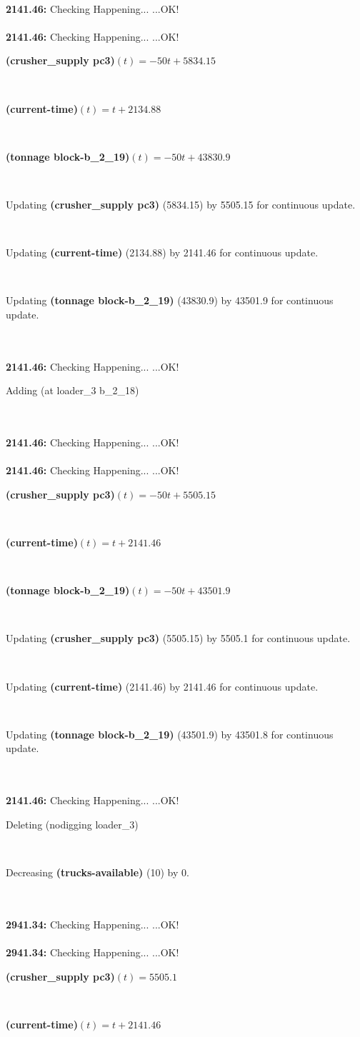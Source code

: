 \documentclass[a4paper,12pt]{article}
\newcommand{\atime}[1]{{\bf #1:}}
\newcommand{\exprn}[1]{{\sf #1}}
\newcommand{\fexprn}[1]{{\small {\bf #1}}}
\newcommand{\checkhappening}{Checking Happening... }
\newcommand{\listrow}[1]{\begin{minipage}[t]{11.5cm} #1 \end{minipage}}
\newcommand{\happeningOK}{...OK!}
\newcommand{\assignmentcts}[3]{\listrow{Updating \fexprn{#1} (#2) by #3 for continuous update.}}
\newcommand{\decrease}[3]{\listrow{Decreasing \fexprn{#1} (#2) by #3.}}
\newcommand{\function}[2]{\listrow{\fexprn{#1}$(t) = #2$}}
\newcommand{\adding}[1]{\listrow{Adding \exprn{#1} }}
\newcommand{\deleting}[1]{\listrow{Deleting \exprn{#1} }}
\begin{document}
\begin{tabbing}
\\
\atime{2141.46} \> \checkhappening\happeningOK\\
\\
\atime{2141.46} \> \checkhappening\happeningOK\\
 \> \function{(crusher\_supply pc3)}{ - 50t + 5834.15}\\
 \> \function{(current-time)}{t + 2134.88}\\
 \> \function{(tonnage block-b\_2\_19)}{ - 50t + 43830.9}\\
 \> \assignmentcts{(crusher\_supply pc3)}{5834.15}{5505.15}\\
 \> \assignmentcts{(current-time)}{2134.88}{2141.46}\\
 \> \assignmentcts{(tonnage block-b\_2\_19)}{43830.9}{43501.9}\\
\\
\atime{2141.46} \> \checkhappening\happeningOK\\
 \> \adding{(at loader\_3 b\_2\_18)}\\
\\
\atime{2141.46} \> \checkhappening\happeningOK\\
\\
\atime{2141.46} \> \checkhappening\happeningOK\\
 \> \function{(crusher\_supply pc3)}{ - 50t + 5505.15}\\
 \> \function{(current-time)}{t + 2141.46}\\
 \> \function{(tonnage block-b\_2\_19)}{ - 50t + 43501.9}\\
 \> \assignmentcts{(crusher\_supply pc3)}{5505.15}{5505.1}\\
 \> \assignmentcts{(current-time)}{2141.46}{2141.46}\\
 \> \assignmentcts{(tonnage block-b\_2\_19)}{43501.9}{43501.8}\\
\\
\atime{2141.46} \> \checkhappening\happeningOK\\
 \> \deleting{(nodigging loader\_3)}\\
 \> \decrease{(trucks-available)}{10}{0}\\
\\
\atime{2941.34} \> \checkhappening\happeningOK\\
\\
\atime{2941.34} \> \checkhappening\happeningOK\\
 \> \function{(crusher\_supply pc3)}{5505.1}\\
 \> \function{(current-time)}{t + 2141.46}\\

\end{tabbing}
\end{document}
